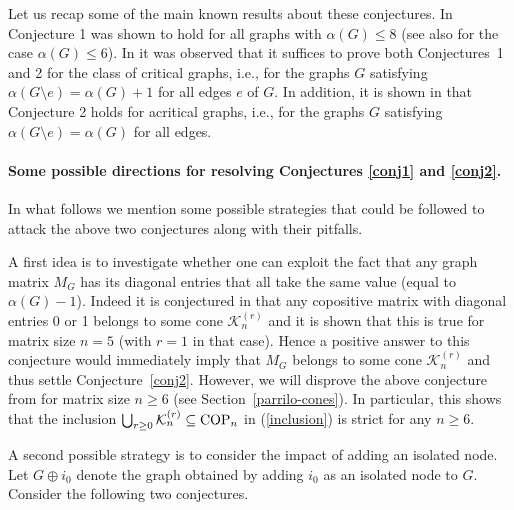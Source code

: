 \documentclass[11pt]{article}
\numberwithin{equation}{section}
\newcommand{\COP}{{\text{\rm COP}}}
\newcommand{\MK}{{\mathcal K}}
\begin{document}
Let us recap some of the main known results about these conjectures. In \cite{GL2007} Conjecture 1 was shown to hold for all graphs with $\alpha(G)\leq 8$ (see also  \cite{PVZ2007} for the case $\alpha(G)\le 6$).
In \cite{LV2021} it was observed that it suffices to prove both Conjectures~1 and  2 for the class of critical graphs, i.e., for the graphs $G$ satisfying $\alpha(G\setminus e)=\alpha(G)+1$ for all edges $e$ of $G$.
 In addition, it is shown in \cite{LV2021}  that Conjecture 2 holds for acritical graphs, i.e., for the graphs $G$ satisfying  $\alpha(G\setminus e)=\alpha(G)$ for all edges. 

\paragraph*{Some possible directions for resolving Conjectures \ref{conj1} and \ref{conj2}.}
In what follows we mention some possible strategies that could be followed to attack the above two conjectures along with their pitfalls.

A first idea is to investigate whether one can exploit the fact that any graph matrix $M_G$ has its diagonal entries that all take the same value (equal to $\alpha(G)-1$). 
Indeed  it is conjectured in \cite{DDGH} that any copositive matrix with diagonal entries 0 or 1 belongs to some cone $\MK_n^{(r)}$ and it is shown that this is true for matrix size $n=5$ (with $r=1$ in that case).
Hence a positive answer to this conjecture would immediately imply that $M_G $ belongs to some cone $\mathcal K^{(r)}_n$ and thus settle Conjecture~\ref{conj2}.  However, we will disprove the above conjecture from \cite{DDGH} for  matrix size $n\geq 6$ (see Section~\ref{parrilo-cones}).  In particular, this shows that the inclusion $\bigcup_{r\geq0}\MK_n^{(r)}\subseteq \COP_n$ in (\ref{inclusion}) is strict for any $n\geq 6$.

A second possible strategy is to consider the impact of adding an isolated node. 
Let $G\oplus i_0$ denote the graph obtained by adding $i_0$ as an isolated node to $G$.
Consider the following two conjectures. %
\end{document}
